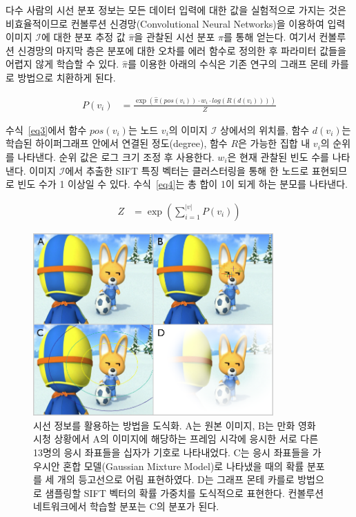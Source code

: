 \documentclass{kcc}
\begin{document}
다수 사람의 시선 분포 정보는 모든 데이터 입력에 대한 값을 실험적으로 가지는 것은 비효율적이므로 컨볼루션 신경망(Convolutional Neural Networks)을 이용하여 입력 이미지 $\mathcal{I}$에 대한 분포 추정 값 $\hat{\pi}$을 관찰된 시선 분포 $\pi$를 통해 얻는다. 여기서 컨볼루션 신경망의 마지막 층은 분포에 대한 오차를 에러 함수로 정의한 후 파라미터 값들을 어렵지 않게 학습할 수 있다. $\hat{\pi}$를 이용한 아래의 수식은 기존 연구의 그래프 몬테 카를로 방법으로 치환하게 된다.

\begin{equation} \label{eq3}
\begin{split}
P(v_{i}) & = \frac{\exp(\hat{\pi}(pos(v_{i})) \cdot w_{i} \cdot log(R(d(v_{i}))))}{Z}
\end{split}
\end{equation}

수식~\ref{eq3}에서 함수 $pos(v_{i})$는 노드 $v_{i}$의 이미지 $\mathcal{I}$ 상에서의 위치를, 함수 $d(v_{i})$는 학습된 하이퍼그래프 안에서 연결된 정도(degree), 함수 $R$은 가능한 집합 내 $v_{i}$의 순위를 나타낸다. 순위 값은 로그 크기 조정 후 사용한다. $w_{i}$은 현재 관찰된 빈도 수를 나타낸다. 이미지 $\mathcal{I}$에서 추출한 SIFT 특징 벡터는 클러스터링을 통해 한 노드로 표현되므로 빈도 수가 1 이상일 수 있다. 수식~\ref{eq4}는 총 합이 1이 되게 하는 분모를 나타낸다.

\begin{equation} \label{eq4}
\begin{split}
Z & = \exp(\sum_{i=1}^{|v|}{P(v_{i})})
\end{split}
\end{equation}

\begin{figure}
  \centerline{\includegraphics[width=92mm,height=70mm]{eps/sel_fig2.png}}
  \caption{시선 정보를 활용하는 방법을 도식화. A는 원본 이미지, B는 만화 영화 시청 상황에서 A의 이미지에 해당하는 프레임 시각에 응시한 서로 다른 13명의 응시 좌표들을 십자가 기호로 나타내었다. C는 응시 좌표들을 가우시안 혼합 모델(Gaussian Mixture Model)로 나타냈을 때의 확률 분포를 세 개의 등고선으로 어림 표현하였다. D는 그래프 몬테 카를로 방법으로 샘플링할 SIFT 벡터의 확률 가중치를 도식적으로 표현한다. 컨볼루션 네트워크에서 학습할 분포는 C의 분포가 된다.}
  \label{fig:selective}
\end{figure}
\end{document}
